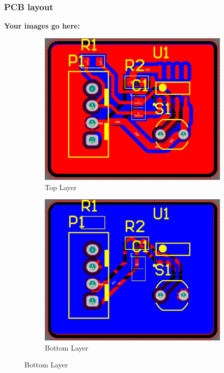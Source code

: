 \subsubsection{PCB layout}
\textbf{Your images go here:}
\begin{figure}[h!]
    \centering
    \begin{subfigure}{0.495\textwidth}
        \centering
        \includegraphics[width=\textwidth]{graphics/ex4/f7.png}
        \caption*{Top Layer}
    \end{subfigure}
    \hfill
    \begin{subfigure}{0.495\textwidth}
        \centering
        \includegraphics[width=\textwidth]{graphics/ex4/f8.png}
        \caption*{Bottom Layer}
    \end{subfigure}
\end{figure}

